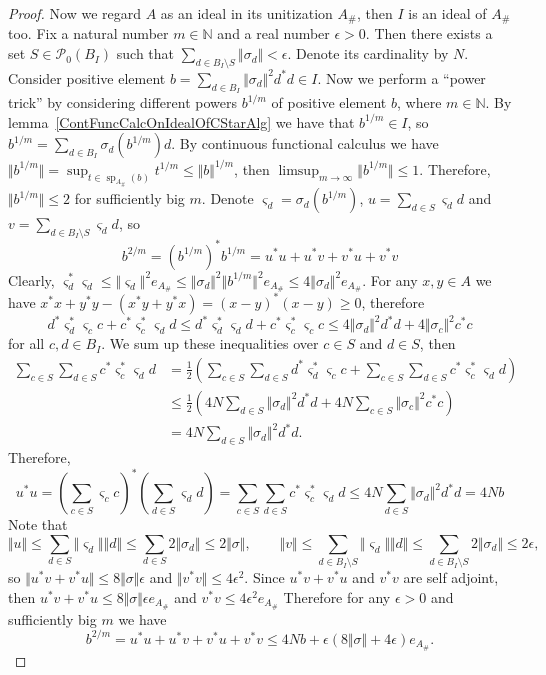 \begin{proof}
Now we regard $A$ as an ideal in its unitization $A_\#$, then $I$ is an ideal of
$A_\#$ too. Fix a natural number $m\in\mathbb{N}$ and a real number
$\epsilon>0$. Then there exists a set $S\in\mathcal{P}_0(B_I)$ such that
$\sum_{d\in B_I\setminus S}\Vert\sigma_d\Vert<\epsilon$. Denote its cardinality
by $N$. Consider positive element 
$b=\sum_{d\in B_I}\Vert\sigma_d\Vert^2 d^*d\in I$. Now we perform 
a ``power trick'' by considering different powers $b^{1/m}$ of positive element 
$b$, where $m\in\mathbb{N}$. By lemma~\ref{ContFuncCalcOnIdealOfCStarAlg} we 
have that $b^{1/m}\in I$, so $b^{1/m}=\sum_{d\in B_I}\sigma_d(b^{1/m})d$. 
By continuous functional calculus we have 
$\Vert b^{1/m}\Vert
=\sup_{t\in\operatorname{sp}_{A_\#}(b)} t^{1/m}\leq\Vert b\Vert^{1/m}$, 
then $\limsup_{m\to\infty}\Vert b^{1/m}\Vert\leq 1$. 
Therefore, $\Vert b^{1/m}\Vert\leq 2$ for sufficiently big $m$. Denote
$\varsigma_d=\sigma_d(b^{1/m})$, $u=\sum_{d\in S}\varsigma_d d$ and
$v=\sum_{d\in B_I\setminus S}\varsigma_d d$, so 
$$
b^{2/m}={(b^{1/m})}^*b^{1/m}=u^*u+u^*v+v^*u+v^*v
$$
Clearly, $\varsigma_d^*\varsigma_d\leq \Vert \varsigma_d\Vert^2 e_{A_\#}\leq
\Vert \sigma_d\Vert^2\Vert b^{1/m}\Vert^2 e_{A_\#}\leq 4\Vert \sigma_d\Vert^2
e_{A_\#}$. For any $x,y\in A$ we have $x^*x+y^*y-(x^*y+y^*x)={(x-y)}^*(x-y)\geq
0$, therefore 
$$
d^*\varsigma_d^* \varsigma_c c+c^*\varsigma_c^* \varsigma_d d
\leq d^*\varsigma_d^*\varsigma_d d + c^*\varsigma_c^*\varsigma_c c
\leq 4\Vert \sigma_d\Vert^2 d^*d+4\Vert \sigma_c\Vert^2 c^*c
$$
for all $c,d\in B_I$. We sum up these inequalities over $c\in S$ and $d\in S$,
then 
$$
\begin{aligned}
\sum_{c\in S}\sum_{d\in S}c^*\varsigma_c^* \varsigma_d d
&=\frac{1}{2}\left(
    \sum_{c\in S}\sum_{d\in S}d^*\varsigma_d^* \varsigma_c c
    +
    \sum_{c\in S}\sum_{d\in S}c^*\varsigma_c^* \varsigma_d d
\right)\\
&\leq\frac{1}{2}\left(4 N\sum_{d\in S} \Vert \sigma_d\Vert^2 d^*d+
4 N\sum_{c\in S} \Vert \sigma_c\Vert^2 c^*c\right)\\
&=4 N\sum_{d\in S} \Vert \sigma_d\Vert^2 d^*d.
\end{aligned}
$$
Therefore,
$$
u^*u
={\left(\sum_{c\in S}\varsigma_c c\right)}^*
\left(\sum_{d\in S}\varsigma_d d\right)
=\sum_{c\in S}\sum_{d\in S}c^*\varsigma_c^* \varsigma_d d
\leq 4N\sum_{d\in S} \Vert \sigma_d\Vert^2 d^*d
= 4N b
$$
Note that
$$
\Vert u\Vert
\leq \sum_{d\in S}\Vert\varsigma_d\Vert\Vert d\Vert
\leq \sum_{d\in S}2\Vert\sigma_d\Vert
\leq 2\Vert\sigma\Vert,
\qquad
\Vert v\Vert
\leq \sum_{d\in B_I\setminus S}\Vert\varsigma_d\Vert\Vert d\Vert
\leq \sum_{d\in B_I\setminus S}2\Vert\sigma_d\Vert
\leq 2\epsilon,
$$
so $\Vert u^*v+v^*u\Vert\leq 8\Vert\sigma\Vert\epsilon$ 
and $\Vert v^*v\Vert\leq 4\epsilon^2$. Since $u^*v+v^*u$ and $v^*v$ are self 
adjoint, then $u^*v+v^*u\leq 8\Vert\sigma\Vert\epsilon e_{A_\#}$ 
and $v^*v\leq 4\epsilon^2 e_{A_\#}$ Therefore for any $\epsilon>0$ and 
sufficiently big $m$ we have 
$$
b^{2/m}
=u^*u+u^*v+v^*u+v^*v
\leq 4Nb+\epsilon(8\Vert\sigma\Vert+4\epsilon)e_{A_\#}.
$$



\end{proof}
